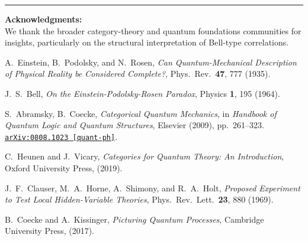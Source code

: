 \documentclass[12pt]{article}
\begin{document}
\vspace{1em}
\hrule
\vspace{1em}

\noindent\textbf{Acknowledgments:}\\
We thank the broader category-theory and quantum foundations communities for insights, particularly on the structural interpretation of Bell-type correlations.

\vspace{1em}

\begin{thebibliography}{9}

A.~Einstein, B.~Podolsky, and N.~Rosen, 
\emph{Can Quantum-Mechanical Description of Physical Reality be Considered Complete?},
Phys.\ Rev.\ \textbf{47}, 777 (1935).

J.~S.~Bell, 
\emph{On the Einstein-Podolsky-Rosen Paradox},
Physics \textbf{1}, 195 (1964).

S.~Abramsky, B.~Coecke,
\emph{Categorical Quantum Mechanics},
in \emph{Handbook of Quantum Logic and Quantum Structures}, Elsevier (2009), pp.~261--323.
\href{https://arxiv.org/abs/0808.1023}{\texttt{arXiv:0808.1023 [quant-ph]}}.

C.~Heunen and J.~Vicary,
\emph{Categories for Quantum Theory: An Introduction},
Oxford University Press, (2019).

J.~F.~Clauser, M.~A.~Horne, A.~Shimony, and R.~A.~Holt,
\emph{Proposed Experiment to Test Local Hidden-Variable Theories},
Phys.\ Rev.\ Lett.\ \textbf{23}, 880 (1969).

B.~Coecke and A.~Kissinger,
\emph{Picturing Quantum Processes},
Cambridge University Press, (2017).

\end{thebibliography}
\end{document}
